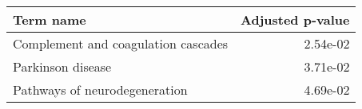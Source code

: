 \begin{tabular}{lr}
\toprule
                          Term name &  Adjusted p-value \\
\midrule
Complement and coagulation cascades &          2.54e-02 \\
                  Parkinson disease &          3.71e-02 \\
      Pathways of neurodegeneration &          4.69e-02 \\
\bottomrule
\end{tabular}

